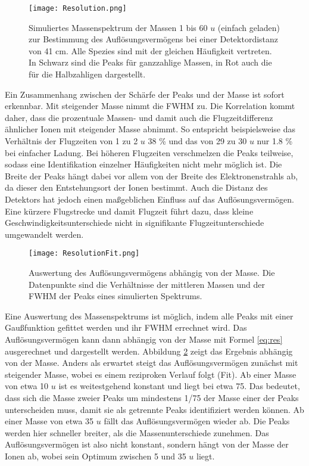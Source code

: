 \begin{figure}
    \centering
    \texttt{[image: Resolution.png]}
    \caption[Simuliertes Massenspektrum (1–60 u, 410 mm) zur Auflösungsbestimmung]{Simuliertes Massenspektrum der Massen 1 bis 60 $u$ (einfach geladen) zur Bestimmung des Auflösungsvermögens bei einer Detektordistanz von 41 cm. Alle Spezies sind mit der gleichen Häufigkeit vertreten. In Schwarz sind die Peaks für ganzzahlige Massen, in Rot auch die für die Halbzahligen dargestellt.}
    \label{fig:res}
\end{figure}

Ein Zusammenhang zwischen der Schärfe der Peaks und der Masse ist sofort erkennbar. Mit steigender Masse nimmt die FWHM zu. Die Korrelation kommt daher, dass die prozentuale Massen- und damit auch die Flugzeitdifferenz ähnlicher Ionen mit steigender Masse abnimmt. So entspricht beispielsweise das Verhältnis der Flugzeiten von 1 zu 2 $u$ 38 \% und das von 29 zu 30 $u$ nur 1.8 \% bei einfacher Ladung. Bei höheren Flugzeiten verschmelzen die Peaks teilweise, sodass eine Identifikation einzelner Häufigkeiten nicht mehr möglich ist. Die Breite der Peaks hängt dabei vor allem von der Breite des Elektronenstrahls ab, da dieser den Entstehungsort der Ionen bestimmt. Auch die Distanz des Detektors hat jedoch einen maßgeblichen Einfluss auf das Auflösungsvermögen. Eine kürzere Flugstrecke und damit Flugzeit führt dazu, dass kleine Geschwindigkeitsunterschiede nicht in signifikante Flugzeitunterschiede umgewandelt werden.

\begin{figure}
    \centering
    \texttt{[image: ResolutionFit.png]}
    \caption[Auswertung des Auflösungsvermögens abhängig von der Masse (410 mm)]{Auswertung des Auflösungsvermögens abhängig von der Masse. Die Datenpunkte sind die Verhältnisse der mittleren Massen und der FWHM der Peaks eines simulierten Spektrums.}
    \label{fig:res_fit}
\end{figure}

Eine Auswertung des Massenspektrums ist möglich, indem alle Peaks mit einer Gaußfunktion gefittet werden und ihr FWHM errechnet wird. Das Auflösungsvermögen kann dann abhängig von der Masse mit Formel \ref{eq:res} ausgerechnet und dargestellt werden. Abbildung \ref{fig:res_fit} zeigt das Ergebnis abhängig von der Masse. Anders als erwartet steigt das Auflösungsvermögen zunächst mit steigender Masse, wobei es einem reziproken Verlauf folgt (Fit). Ab einer Masse von etwa 10 $u$ ist es weitestgehend konstant und liegt bei etwa 75. Das bedeutet, dass sich die Masse zweier Peaks um mindestens 1/75 der Masse einer der Peaks unterscheiden muss, damit sie als getrennte Peaks identifiziert werden können. Ab einer Masse von etwa 35 $u$ fällt das Auflösungsvermögen wieder ab. Die Peaks werden hier schneller breiter, als die Massenunterschiede zunehmen. Das Auflösungsvermögen ist also nicht konstant, sondern hängt von der Masse der Ionen ab, wobei sein Optimum zwischen 5 und 35 $u$ liegt.

